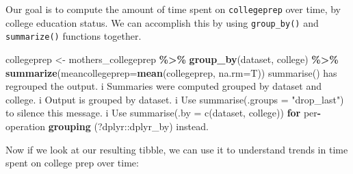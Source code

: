 \documentclass[
]{book}
\newenvironment{Shaded}{\begin{snugshade}}{\end{snugshade}}
\newcommand{\AttributeTok}[1]{\textcolor[rgb]{0.13,0.29,0.53}{#1}}
\newcommand{\ControlFlowTok}[1]{\textcolor[rgb]{0.13,0.29,0.53}{\textbf{#1}}}
\newcommand{\FunctionTok}[1]{\textcolor[rgb]{0.13,0.29,0.53}{\textbf{#1}}}
\newcommand{\NormalTok}[1]{#1}
\newcommand{\OtherTok}[1]{\textcolor[rgb]{0.56,0.35,0.01}{#1}}
\newcommand{\SpecialCharTok}[1]{\textcolor[rgb]{0.81,0.36,0.00}{\textbf{#1}}}
\newcommand{\StringTok}[1]{\textcolor[rgb]{0.31,0.60,0.02}{#1}}
\begin{document}
Our goal is to compute the amount of time spent on \texttt{collegeprep} over time, by college education status. We can accomplish this by using \texttt{group\_by()} and \texttt{summarize()} functions together.

\begin{Shaded}
\begin{Highlighting}[]
\NormalTok{collegeprep }\OtherTok{\textless{}{-}}\NormalTok{ mothers\_collegeprep }\SpecialCharTok{\%\textgreater{}\%}
  \FunctionTok{group\_by}\NormalTok{(dataset, college) }\SpecialCharTok{\%\textgreater{}\%}
  \FunctionTok{summarize}\NormalTok{(}\AttributeTok{meancollegeprep=}\FunctionTok{mean}\NormalTok{(collegeprep, }\AttributeTok{na.rm=}\NormalTok{T))}
\StringTok{\textasciigrave{}}\AttributeTok{summarise()}\StringTok{\textasciigrave{}}\NormalTok{ has regrouped the output.}
\NormalTok{i Summaries were computed grouped by dataset and college.}
\NormalTok{i Output is grouped by dataset.}
\NormalTok{i Use }\StringTok{\textasciigrave{}}\AttributeTok{summarise(.groups = "drop\_last")}\StringTok{\textasciigrave{}}\NormalTok{ to silence this}
\NormalTok{  message.}
\NormalTok{i Use }\StringTok{\textasciigrave{}}\AttributeTok{summarise(.by = c(dataset, college))}\StringTok{\textasciigrave{}} \ControlFlowTok{for}
\NormalTok{  per}\SpecialCharTok{{-}}\NormalTok{operation }\FunctionTok{grouping}\NormalTok{ (}\StringTok{\textasciigrave{}}\AttributeTok{?dplyr::dplyr\_by}\StringTok{\textasciigrave{}}\NormalTok{) instead.}
\end{Highlighting}
\end{Shaded}

Now if we look at our resulting tibble, we can use it to understand trends in time spent on college prep over time:
\end{document}
